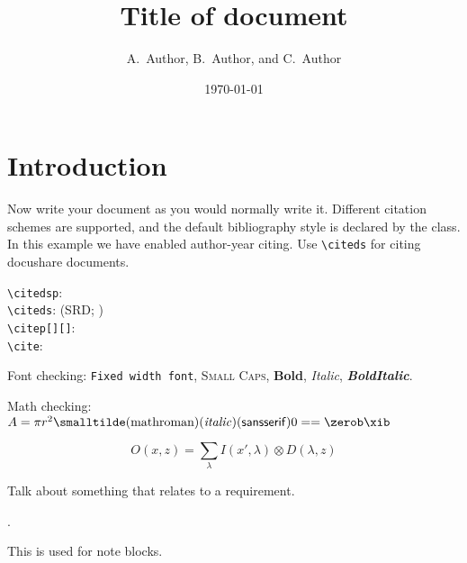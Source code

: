 \documentclass[DM,lsstdraft,authoryear,toc]{lsstdoc}
\title[Short title]{Title of document}
\author{
A.~Author,
B.~Author,
and
C.~Author}
\date{\today}
\begin{document}
\maketitle

\section{Introduction}

Now write your document as you would normally write it.
Different citation schemes are supported, and the default bibliography style is declared by the class.
In this example we have enabled author-year citing.
Use \verb|\citeds| for citing docushare documents.

\verb|\citedsp|:  \\
\verb|\citeds|: (SRD; ) \\
\verb|\citep[][]|: \citep[e.g.,][are interesting]{2009arXiv0912.0201L,2016SPIE.9913E..0GJ} \\
\verb|\cite|: \cite{LPM-51,Wang:2011:QDS:2063348.2063364}

Font checking: \texttt{Fixed width font}, \textsc{Small Caps}, \textbf{Bold}, \textit{Italic}, \textbf{\textit{BoldItalic}}.

Math checking: $A = \pi r^2 \smalltilde\mathrm{(math roman)}\mathit{(italic)}\mathsf{(sans serif)} 0 == \zerob \xib$

\begin{equation}
O(x, z) = \sum_\lambda I(x',\lambda) \otimes D(\lambda, z)
\end{equation}

Talk about something that relates to a requirement.

 .

\begin{note}
  This is used for note blocks.
\end{note}


\end{document}
